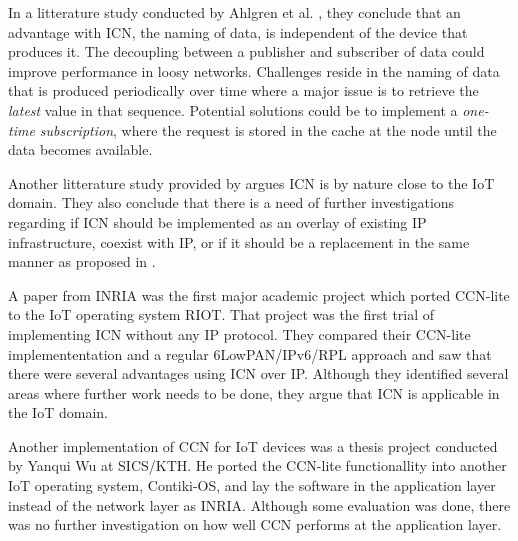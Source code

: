 In a litterature study conducted by Ahlgren et al. \cite{Ahlgreniot}, they conclude that an advantage with ICN, the naming of data, is independent of the device that produces it. The decoupling between a publisher and subscriber of data could improve performance in loosy networks. Challenges reside in the naming of data that is produced periodically over time where a major issue is to retrieve the \textit{latest} value in that sequence. Potential solutions could be to implement a \textit{one-time subscription}, where the request is stored in the cache at the node until the data becomes available\cite{Ahlgreniot}. 

Another litterature study provided by \cite{iotchop} argues ICN is by nature close to the IoT domain. They also conclude that there is a need of further investigations regarding if ICN should be implemented as an overlay of existing IP infrastructure, coexist with IP, or if it should be a replacement in the same manner as proposed in \cite{Jacobson2009}.

A paper from INRIA was the first major academic project which ported CCN-lite to the IoT operating system RIOT\cite{icniotexpinwild}\cite{RIOT}. That project was the first trial of implementing ICN without any IP protocol. They compared their CCN-lite implemententation and a regular 6LowPAN/IPv6/RPL approach and saw that there were several advantages using ICN over IP. Although they identified several areas where further work needs to be done, they argue that ICN is applicable in the IoT domain.

Another implementation of CCN for IoT devices was a thesis project conducted by Yanqui Wu at SICS/KTH\cite{yanqui}. He ported the CCN-lite functionallity into another IoT operating system, Contiki-OS, and lay the software in the application layer instead of the network layer as INRIA. Although some evaluation was done, there was no further investigation on how well CCN performs at the application layer. \\




